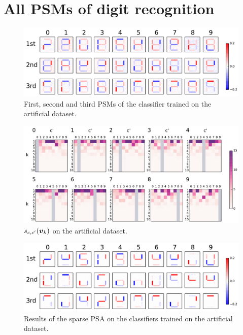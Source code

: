 \clearpage
\section{All PSMs of digit recognition}
\label{sec:appendix_digit}
%
%
\vspace{2cm}
%
\begin{figure}[htbp]
 \centering
 \includegraphics[width=0.9\columnwidth]{./fig/appendix1.pdf}
 \caption{
 First, second and third PSMs of the classifier trained on the artificial dataset.
 }
 \label{app:1}
\end{figure}
%
\vspace{2cm}
%
\begin{figure}[htbp]
 \centering
 \includegraphics[width=0.9\columnwidth]{./fig/appendix2.pdf}
 \caption{
 $s_{c, c'}(\mbox{\boldmath $v$}_{k})$ on the artificial dataset.
 }
 \label{app:2}
\end{figure}
%
\begin{figure}[htbp]
 \centering
 \includegraphics[width=0.9\columnwidth]{./fig/appendix3.pdf}
 \caption{
 Results of the sparse PSA on the classifiers trained on the artificial dataset.
 }
 \label{app:3}
\end{figure}
